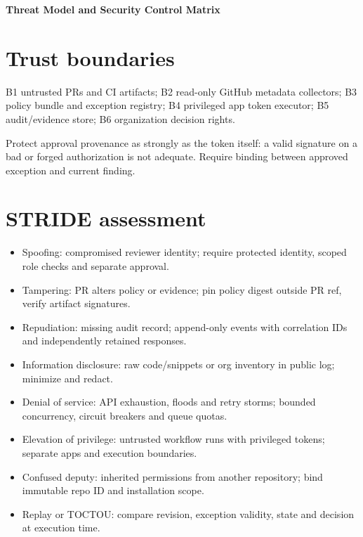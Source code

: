 \documentclass[11pt,letterpaper]{article}
\begin{document}
\begin{center}
{\LARGE\bfseries Threat Model and Security Control Matrix}\par
\vspace{5pt}{\large STRIDE with risk-based prioritization and failure scenarios}\par
\vspace{9pt}{\small Engineering reference | Proposed design | Not a deployment or approval record}\par
\end{center}
\tableofcontents
\clearpage
\section{Trust boundaries}
B1 untrusted PRs and CI artifacts; B2 read-only GitHub metadata collectors; B3 policy bundle and exception registry; B4 privileged app token executor; B5 audit/evidence store; B6 organization decision rights.

Protect approval provenance as strongly as the token itself: a valid signature on a bad or forged authorization is not adequate. Require binding between approved exception and current finding.


\section{STRIDE assessment}
\begin{itemize}
\item Spoofing: compromised reviewer identity; require protected identity, scoped role checks and separate approval.
\item Tampering: PR alters policy or evidence; pin policy digest outside PR ref, verify artifact signatures.
\item Repudiation: missing audit record; append-only events with correlation IDs and independently retained responses.
\item Information disclosure: raw code/snippets or org inventory in public log; minimize and redact.
\item Denial of service: API exhaustion, floods and retry storms; bounded concurrency, circuit breakers and queue quotas.
\item Elevation of privilege: untrusted workflow runs with privileged tokens; separate apps and execution boundaries.
\item Confused deputy: inherited permissions from another repository; bind immutable repo ID and installation scope.
\item Replay or TOCTOU: compare revision, exception validity, state and decision at execution time.
\end{itemize}
\end{document}
